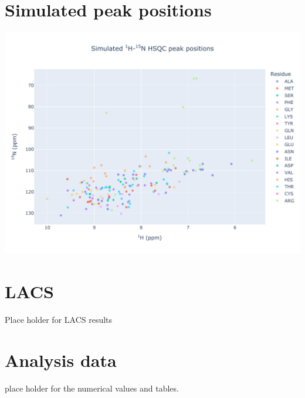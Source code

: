 \section{Simulated peak positions}
\includegraphics[width=18cm]{30478_n15.pdf}\\

\section{LACS}
Place holder for LACS results
\section{Analysis data}
place holder for the numerical values and tables.
